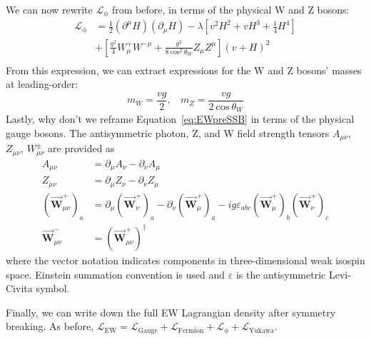We can now rewrite $\mathcal{L}_\mathrm{\phi}$ from before, in terms of the physical W and Z bosons:
\begin{equation}
\label{eq:LhiggsWZ}
\begin{split}
\mathcal{L}_\mathrm{\phi} & = \frac{1}{2} (\partial^\mu H) (\partial_\mu H) - \lambda\left[ v^2H^2 + vH^3 + \frac{1}{4}H^4\right] \\
& + \left[ \frac{g^2}{4} W^+_\mu W^{{-}\mu}  + \frac{g^2}{8\:\mathrm{cos}^2\:\theta_W} Z_\mu Z^\mu \right](v+H)^2   \\
\end{split}
\end{equation}
From this expression, we can extract expressions for the W and Z bosons' masses at leading-order:
\begin{equation}
\label{eq:WZmass}
m_W = \frac{v g}{2},\:\:\:\:m_Z = \frac{vg}{2\:\mathrm{cos}\:\theta_W}
\end{equation}
Lastly, why don't we reframe Equation~\ref{eq:EWpreSSB} in terms of the physical gauge bosons.
The antisymmetric photon, Z, and W field strength tensors $A_{\mu\nu}$, $Z_{\mu\nu}$, $W^{\pm}_{\mu\nu}$ are provided as
\begin{equation}
\begin{split}
A_{\mu\nu} &= \partial_\mu A_\nu - \partial_\nu A_\mu \\
Z_{\mu\nu} &= \partial_\mu Z_\nu - \partial_\nu Z_\mu \\
(\vec{\mathbf{W}}^{+}_{\mu\nu})_a &= \partial_\mu (\vec{\mathbf{W}}^{+}_\nu)_a - \partial_\nu (\vec{\mathbf{W}}^{+}_\mu)_a - ig\varepsilon_{abc}(\vec{\mathbf{W}}^{+}_\mu)_b (\vec{\mathbf{W}}^{+}_\nu)_c \\
\vec{\mathbf{W}}^{-}_{\mu\nu} &= (\vec{\mathbf{W}}^{+}_{\mu\nu})^\dagger
\end{split}
\end{equation}
where the vector notation indicates components in three-dimensional weak isospin space.
Einstein summation convention is used and $\varepsilon$ is the antisymmetric Levi-Civita symbol.


Finally, we can write down the full EW Lagrangian density after symmetry breaking. 
As before, $\mathcal{L}_\mathrm{EW} = \mathcal{L}_\mathrm{Gauge} + \mathcal{L}_\mathrm{Fermion} + \mathcal{L}_\mathrm{\phi} + \mathcal{L}_\mathrm{Yukawa}$. 

